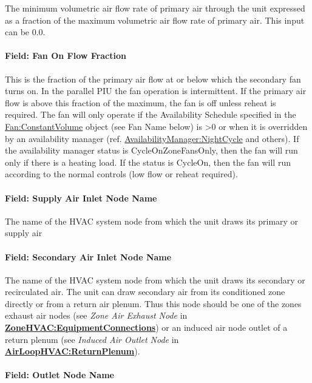 The minimum volumetric air flow rate of primary air through the unit expressed as a fraction of the maximum volumetric air flow rate of primary air. This input can be 0.0.

\paragraph{Field: Fan On Flow Fraction}\label{field-fan-on-flow-fraction}

This is the fraction of the primary air flow at or below which the secondary fan turns on. In the parallel PIU the fan operation is intermittent. If the primary air flow is above this fraction of the maximum, the fan is off unless reheat is required. The fan will only operate if the Availability Schedule specified in the \hyperref[fanconstantvolume]{Fan:ConstantVolume} object (see Fan Name below) is >0 or when it is overridden by an availability manager (ref. \hyperref[availabilitymanagernightcycle]{AvailabilityManager:NightCycle} and others). If the availability manager status is CycleOnZoneFansOnly, then the fan will run only if there is a heating load.  If the status is CycleOn, then the fan will run according to the normal controls (low flow or reheat required).

\paragraph{Field: Supply Air Inlet Node Name}\label{field-supply-air-inlet-node-name-1}

The name of the HVAC system node from which the unit draws its primary or supply air

\paragraph{Field: Secondary Air Inlet Node Name}\label{field-secondary-air-inlet-node-name-1}

The name of the HVAC system node from which the unit draws its secondary or recirculated air. The unit can draw secondary air from its conditioned zone directly or from a return air plenum. Thus this node should be one of the zones exhaust air nodes (see \emph{Zone Air Exhaust Node} in \textbf{\hyperref[zonehvacequipmentconnections]{ZoneHVAC:EquipmentConnections}}) or an induced air node outlet of a return plenum (see \emph{Induced Air Outlet Node} in \textbf{\hyperref[airloophvacreturnplenum]{AirLoopHVAC:ReturnPlenum}}).

\paragraph{Field: Outlet Node Name}\label{field-outlet-node-name-1}

